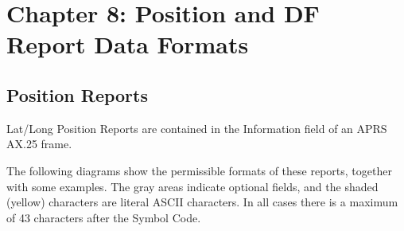 \chapter{Chapter 8: Position and DF Report Data Formats}

\section{Position Reports}

Lat/Long Position Reports are contained in the Information field of an APRS AX.25 frame.

The following diagrams show the permissible formats of these reports,
together with some examples. The gray areas indicate optional fields, and the
shaded (yellow) characters are literal ASCII characters. In all cases there is a
maximum of 43 characters after the Symbol Code.


